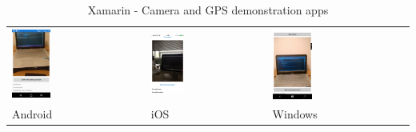 \documentclass[english,master,public,dept460,male,cpdeclaration,oneside]{diploma}
\begin{document}
\begin{table}[!h]
	\centering
	\caption{Xamarin - Camera and GPS demonstration apps}
	\label{table:xamarin3}
	\begin{tabular}{p{5cm} | p{5cm} | p{5cm} }
		\toprule		
		\includegraphics[width=0.3\textwidth]{Figures/xamarin3android.PNG}
		& \includegraphics[width=0.3\textwidth]{Figures/xamarin3ios.jpg}
		& \includegraphics[width=0.3\textwidth]{Figures/xamarin3windows.PNG}
		\\
		Android & iOS & Windows \\
		\midrule
	\end{tabular}
\end{table}
\end{document}
